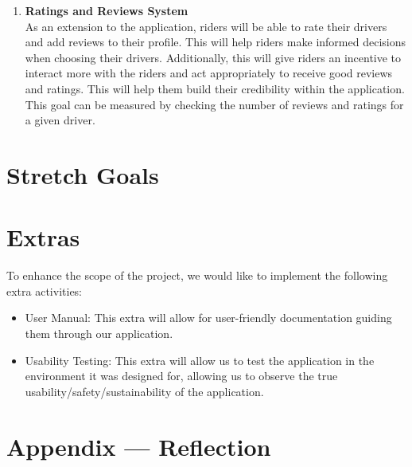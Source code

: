 \documentclass{article}
\begin{document}
\begin{enumerate}
\item \textbf{Ratings and Reviews System} \\
As an extension to the application, riders will be able to rate their drivers and add reviews to their profile. This will help riders make informed decisions when choosing their drivers. Additionally, this will give riders an incentive to interact more with the riders and act appropriately to receive good reviews and ratings. This will help them build their credibility within the application. This goal can be measured by checking the number of reviews and ratings for a given driver. 
\end{enumerate}

\section{Stretch Goals}

\section{Extras} 

To enhance the scope of the project, we would like to implement the following extra
activities:
\begin{itemize}
\item User Manual: This extra will allow for user-friendly documentation guiding them 
through our application.
\item Usability Testing: This extra will allow us to test the application in the environment
it was designed for, allowing us to observe the true usability/safety/sustainability of the application.
\end{itemize}


\newpage{}

\section*{Appendix --- Reflection}



\end{document}
